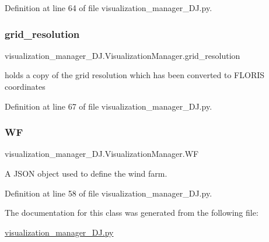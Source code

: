 Definition at line 64 of file visualization\+\_\+manager\+\_\+\+D\+J.\+py.

\mbox{\label{classvisualization__manager___d_j_1_1_visualization_manager_ad5b8013f5cdf47f6384ae56186810e2b}} 
\subsubsection{\texorpdfstring{grid\+\_\+resolution}{grid\_resolution}}
{\footnotesize\ttfamily visualization\+\_\+manager\+\_\+\+D\+J.\+Visualization\+Manager.\+grid\+\_\+resolution}



holds a copy of the grid resolution which has been converted to F\+L\+O\+R\+IS coordinates 



Definition at line 67 of file visualization\+\_\+manager\+\_\+\+D\+J.\+py.

\mbox{\label{classvisualization__manager___d_j_1_1_visualization_manager_a56add1b450c7ecd758b096117f593578}} 
\subsubsection{\texorpdfstring{WF}{WF}}
{\footnotesize\ttfamily visualization\+\_\+manager\+\_\+\+D\+J.\+Visualization\+Manager.\+WF}



A J\+S\+ON object used to define the wind farm. 



Definition at line 58 of file visualization\+\_\+manager\+\_\+\+D\+J.\+py.



The documentation for this class was generated from the following file\+:\begin{DoxyCompactItemize}
\item 
\mbox{\hyperlink{visualization__manager___d_j_8py}{visualization\+\_\+manager\+\_\+\+D\+J.\+py}}\end{DoxyCompactItemize}
